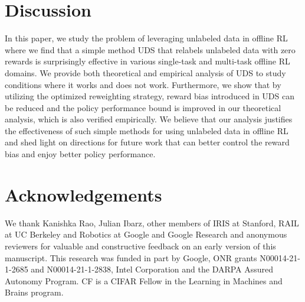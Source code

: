 \documentclass[nohyperref]{article}
\theoremstyle{plain}
\theoremstyle{definition}
\theoremstyle{remark}
\begin{document}








\section{Discussion}

In this paper, we study the problem of leveraging unlabeled data in offline RL where we find that a simple method UDS that relabels unlabeled data with zero rewards is surprisingly effective in various single-task and multi-task offline RL domains. We provide both theoretical and empirical analysis of UDS to study conditions where it works and does not work. Furthermore, we show that by utilizing the optimized reweighting strategy, reward bias introduced in UDS can be reduced and the policy performance bound is improved in our theoretical analysis, which is also verified empirically. We believe that our analysis justifies the effectiveness of such simple methods for using unlabeled data in offline RL and shed light on directions for future work that can better control the reward bias and enjoy better policy performance.


\section*{Acknowledgements}
We thank Kanishka Rao, Julian Ibarz, other members of IRIS at Stanford, RAIL at UC Berkeley and Robotics at Google and Google Research and anonymous reviewers for valuable and constructive feedback on an early version of this manuscript. This research was funded in part by Google, ONR grants N00014-21-1-2685 and N00014-21-1-2838, Intel Corporation and the DARPA Assured Autonomy Program. CF is a CIFAR Fellow in the Learning in Machines and Brains program. 




\newpage
\appendix
\onecolumn

\end{document}

